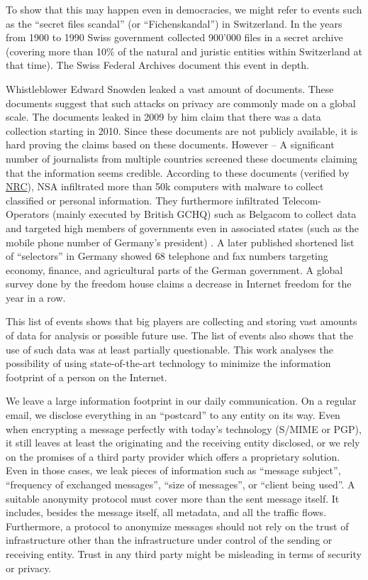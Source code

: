 To show that this may happen even in democracies, we might refer to events such as the ``secret files scandal'' (or  ``Fichenskandal'') in Switzerland. In the years from 1900 to 1990 Swiss government collected 900’000 files in a secret archive (covering more than 10\% of the natural and juristic entities within Switzerland at that time). The Swiss Federal Archives document this event in depth\cite{Leuenberger1989}.

Whistleblower Edward Snowden leaked a vast amount of documents. These documents suggest that such attacks on privacy are commonly made on a global scale. The documents leaked in 2009 by him claim that there was a data collection starting in 2010. Since these documents are not publicly available, it is hard proving the claims based on these documents. However -- A significant number of journalists from multiple countries screened these documents claiming that the information seems credible. According to these documents (verified by \href{http://www.nrc.nl/nieuws/2013/11/23/nederland-sinds-1946-doelwit-van-nsa}{NRC}), NSA infiltrated more than 50k computers with malware to collect classified or personal information. They furthermore infiltrated Telecom-Operators (mainly executed by British GCHQ) such as Belgacom to collect data and targeted high members of governments even in associated states (such as the mobile phone number of Germany's president) \cite{NCR2013,XKeyscore,Ball2013,Ackerman2013,Greenberg2013}. A later published shortened list of ``selectors'' in Germany showed 68 telephone and fax numbers targeting economy, finance, and agricultural parts of the German government. A global survey done by the freedom house\cite{FOTN2018} claims a decrease in Internet freedom for the  year in a row. 

This list of events shows that big players are collecting and storing vast amounts of data for analysis or possible future use. The list of events also shows that the use of such data was at least partially questionable. This work analyses the possibility of using state-of-the-art technology to minimize the information footprint of a person on the Internet. 

We leave a large information footprint in our daily communication. On a regular email, we disclose everything in an ``postcard'' to any entity on its way. Even when encrypting a message perfectly with today's technology (S/MIME\cite{rfc2045} or PGP\cite{rfc2015}), it still leaves at least the originating and the receiving entity disclosed, or we rely on the promises of a third party provider which offers a proprietary solution. Even in those cases, we leak pieces of information such as ``message subject'', ``frequency of exchanged messages'', ``size of messages'', or ``client being used''. A suitable anonymity protocol must cover more than the sent message itself. It includes, besides the message itself, all metadata, and all the traffic flows. Furthermore, a protocol to anonymize messages should not rely on the trust of infrastructure other than the infrastructure under control of the sending or receiving entity. Trust in any third party might be misleading in terms of security or privacy.

